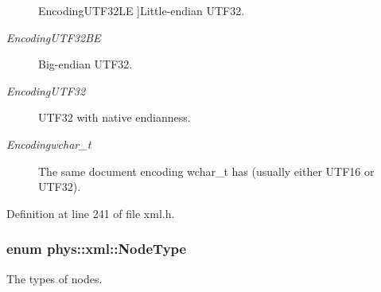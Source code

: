 \begin{Desc}
\begin{description}
{{EncodingUTF32LE}
\label{d9/d27/namespacephys_1_1xml_a420f5de782438f88160321385bea2015a127752883aaf8c9bdb5f66ec725211fc}
}]Little-\/endian UTF32. \item[{\em 
\hypertarget{namespacephys_1_1xml_a420f5de782438f88160321385bea2015a5fb13deaf1552b0f4c00e2b8cafce0b9}{
EncodingUTF32BE}
\label{d9/d27/namespacephys_1_1xml_a420f5de782438f88160321385bea2015a5fb13deaf1552b0f4c00e2b8cafce0b9}
}]Big-\/endian UTF32. \item[{\em 
\hypertarget{namespacephys_1_1xml_a420f5de782438f88160321385bea2015ac61c2f632bd66c2466c29783beb33f8a}{
EncodingUTF32}
\label{d9/d27/namespacephys_1_1xml_a420f5de782438f88160321385bea2015ac61c2f632bd66c2466c29783beb33f8a}
}]UTF32 with native endianness. \item[{\em 
\hypertarget{namespacephys_1_1xml_a420f5de782438f88160321385bea2015a2bc9c8d42796901c8feaa25e17c56cef}{
Encodingwchar\_\-t}
\label{d9/d27/namespacephys_1_1xml_a420f5de782438f88160321385bea2015a2bc9c8d42796901c8feaa25e17c56cef}
}]The same document encoding wchar\_\-t has (usually either UTF16 or UTF32). \end{description}
\end{Desc}



Definition at line 241 of file xml.h.

\hypertarget{namespacephys_1_1xml_a668b0cc666a9d49f7c7222a7552115d3}{
\subsubsection[{NodeType}]{\setlength{\rightskip}{0pt plus 5cm}enum {\bf phys::xml::NodeType}}}
\label{d9/d27/namespacephys_1_1xml_a668b0cc666a9d49f7c7222a7552115d3}


The types of nodes. 

